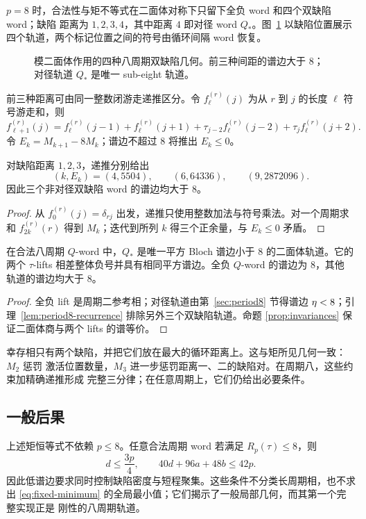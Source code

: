 $p=8$ 时，合法性与矩不等式在二面体对称下只留下全负 word 和四个双缺陷 word；缺陷
距离为 $1,2,3,4$，其中距离 $4$ 即对径 word $Q_*$。图~\ref{fig:defect-orbits}
以缺陷位置展示四个轨道，两个标记位置之间的符号由循环间隔 word 恢复。

\begin{figure}[t]
 \centering
 
 \caption{模二面体作用的四种八周期双缺陷几何。前三种间距的谱边大于 $8$；对径轨道
 $Q_*$ 是唯一 sub-eight 轨道。}
 \label{fig:defect-orbits}
\end{figure}

前三种距离可由同一整数闭游走递推区分。令 $f_\ell^{(r)}(j)$ 为从 $r$ 到 $j$ 的长度
$\ell$ 符号游走和，则
\begin{equation}
 f_{\ell+1}^{(r)}(j)=f_\ell^{(r)}(j-1)+f_\ell^{(r)}(j+1)
 +\tau_{j-2}f_\ell^{(r)}(j-2)+\tau_jf_\ell^{(r)}(j+2).
 \label{eq:walk-recurrence}
\end{equation}
令 $E_k=M_{k+1}-8M_k$；谱边不超过 $8$ 将推出 $E_k\leq0$。

\begin{lemma}
\label{lem:period8-recurrence}
对缺陷距离 $1,2,3$，递推分别给出
\begin{equation}
 (k,E_k)=(4,5504),\qquad(6,64336),\qquad(9,2872096).
 \label{eq:period8-excesses}
\end{equation}
因此三个非对径双缺陷 word 的谱边均大于 $8$。
\end{lemma}

\begin{proof}
从 $f_0^{(r)}(j)=\delta_{rj}$ 出发，递推只使用整数加法与符号乘法。对一个周期求和
$f_{2k}^{(r)}(r)$ 得到 $M_k$；迭代到所列 $k$ 得三个正余量，与 $E_k\leq0$ 矛盾。
\end{proof}

\begin{theorem}
\label{thm:period8-trichotomy}
在合法八周期 $Q$-word 中，$Q_*$ 是唯一平方 Bloch 谱边小于 $8$ 的二面体轨道。它的
两个 $\tau$-lifts 相差整体负号并具有相同平方谱边。全负 $Q$-word 的谱边为 $8$，其他
轨道的谱边均大于 $8$。
\end{theorem}

\begin{proof}
全负 lift 是周期二参考相；对径轨道由第~\ref{sec:period8} 节得谱边
$\eta<8$；引理~\ref{lem:period8-recurrence} 排除另外三个双缺陷轨道。命题
\ref{prop:invariances} 保证二面体商与两个 lifts 的谱等价。
\end{proof}

幸存相只有两个缺陷，并把它们放在最大的循环距离上。这与矩所见几何一致：$M_2$ 惩罚
激活位置数量，$M_3$ 进一步惩罚距离一、二的缺陷对。在周期八，这些约束加精确递推形成
完整三分律；在任意周期上，它们仍给出必要条件。

\subsection{一般后果}

上述矩恒等式不依赖 $p\leq8$。任意合法周期 word 若满足 $R_p(\tau)\leq8$，则
\begin{equation}
 d\leq\frac{3p}{4},\qquad 40d+96a+48b\leq42p.
 \label{eq:general-defect-bounds}
\end{equation}
因此低谱边要求同时控制缺陷密度与短程聚集。这些条件不分类长周期相，也不求出
\eqref{eq:fixed-minimum} 的全局最小值；它们揭示了一般局部几何，而其第一个完整实现正是
刚性的八周期轨道。
